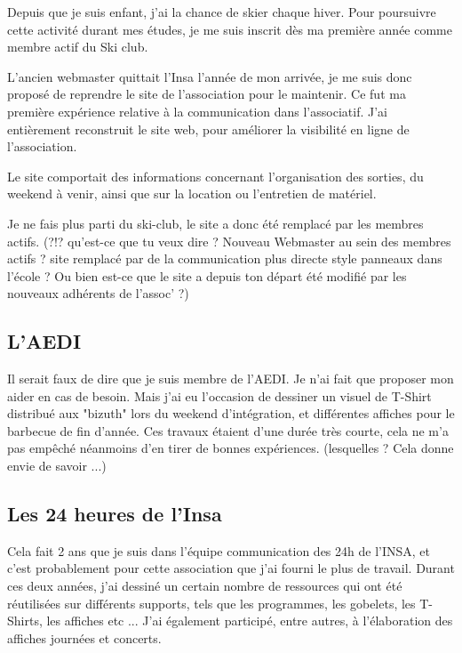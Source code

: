         Depuis que je suis enfant,  j'ai la chance de skier chaque hiver. Pour poursuivre cette activité durant mes études, je me suis inscrit dès ma première année comme membre actif du Ski club.
        
        L'ancien webmaster quittait l'Insa l'année de mon arrivée, je me suis donc proposé de reprendre le site de l'association pour le maintenir.
        Ce fut ma première expérience relative à la communication dans l'associatif.
        J'ai entièrement reconstruit le site web, pour améliorer la visibilité en ligne de l'association.
        
        Le site comportait des informations concernant l'organisation des sorties, du weekend à venir, ainsi que sur la location ou l'entretien de matériel.
        
        Je ne fais plus parti du ski-club, le site a donc été remplacé par les membres actifs. (?!? qu'est-ce que tu veux dire ? Nouveau Webmaster au sein des membres actifs ? site remplacé par de la communication plus directe style panneaux dans l'école ? Ou bien est-ce que le site a depuis ton départ été modifié par les nouveaux adhérents de l'assoc' ?)
        
    \subsection{L'AEDI}
        
        Il serait faux de dire que je suis membre de l'AEDI. Je n'ai fait que proposer mon aider en cas de besoin.
        Mais j'ai eu l'occasion de dessiner un visuel de T-Shirt distribué aux "bizuth" lors du weekend d'intégration, et différentes affiches pour le barbecue de fin d'année.
        Ces travaux étaient d'une durée très courte, cela ne m'a pas empêché néanmoins d'en tirer de bonnes expériences. (lesquelles ? Cela donne envie de savoir ...)
        
    \subsection{Les 24 heures de l'Insa}
        
        Cela fait 2 ans que je suis dans l'équipe communication des 24h de l'INSA, et c'est probablement pour cette association que j'ai fourni le plus de travail.
        Durant ces deux années,  j'ai dessiné un certain nombre de ressources qui ont été réutilisées sur différents supports, tels que les programmes, les gobelets, les T-Shirts, les affiches etc ...
        J'ai également participé, entre autres, à l'élaboration des affiches journées et concerts.
        
